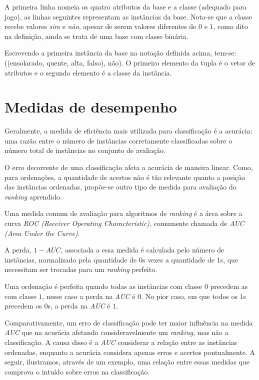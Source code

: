 A primeira linha nomeia os quatro atributos da base e a classe (adequado para jogo), as linhas seguintes representam as instâncias da base. Nota-se que a classe recebe valores \emph{sim} e \emph{não}, apesar de serem valores diferentes de $0$ e $1$, como dito na definição, ainda se trata de uma base com classe binária.

Escrevendo a primeira instância da base na notação definida acima, tem-se: ((ensolarado, quente, alta, falso), não). O primeiro elemento da tupla é o vetor de atributos e o segundo elemento é a classe da instância.


\section{Medidas de desempenho}

Geralmente, a medida de eficiência mais utilizada para classificação é a acurácia: uma razão entre o número de instâncias corretamente classificadas sobre o número total de instâncias no conjunto de avaliação.

O erro decorrente de uma classificação afeta a acurácia de maneira linear. Como, para ordenações, a quantidade de acertos não é tão relevante quanto a posição das instâncias ordenadas, propõe-se outro tipo de medida para avaliação do \emph{ranking} aprendido.

Uma medida comum de avaliação para algoritmos de \emph{ranking} é a área sobre a curva \emph{ROC (Receiver Operating Characteristic)}, comumente chamada de \emph{AUC (Area Under the Curve)}.

A perda, $1 - AUC$, associada a essa medida é calculada pelo número de instâncias, normalizado pela quantidade de $0$s vezes a quantidade de $1$s, que necessitam ser trocadas para um \emph{ranking} perfeito.

Uma ordenação é perfeita quando todas as instâncias com classe $0$ precedem as com classe $1$, nesse caso a perda na \emph{AUC} é $0$. No pior caso, em que todos os $1$s precedem os $0$s, a perda na \emph{AUC} é $1$.

Comparativamente, um erro de classificação pode ter maior influência na medida \emph{AUC} que na acurácia afetando consideravelmente um \emph{ranking}, mas não a classificação. A causa disso é a \emph{AUC} considerar a relação entre as instâncias ordenadas, enquanto a acurácia considera apenas erros e acertos pontualmente. A seguir, ilustramos, através de um exemplo, uma relação entre essas medidas que comprova o intuído sobre erros na classificação.

